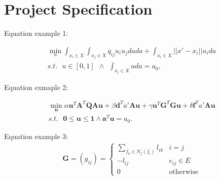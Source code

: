 \chapter{Project Specification}
\label{cha:Project Specification}

Equation example 1:

\begin{equation}
\begin{split}
\min_u \int_{x_i\in X}\int_{x_j\in X} q_{ij} u_i u_j da da + \int_{x_i\in X}||x' - x_i|| u_i da \\
s.t. \ \ \ u\in[0,1] \ \ \land  \ \ \int_{x_i\in X}u da = a_0,
\end{split}
\end{equation}

Equation exmaple 2:

\begin{equation}
\begin{split}
\min_{\mathbf{u}} \alpha \mathbf{u}^T \mathbf{A}^T \mathbf{Q} \mathbf{A} \mathbf{u} +  \beta \mathbf{d}^T a' \mathbf{A} \mathbf{u} + \gamma \mathbf{u}^T \mathbf{G}^T \mathbf{G} \mathbf{u} + \delta\mathbf{f}^T a' \mathbf{A} \mathbf{u} \\
s.t. \ \ \ \mathbf{0} \leq \mathbf{u} \leq \mathbf{1} \land \mathbf{a}^T\mathbf{u}=a_0.
\end{split}
\end{equation}

Equation example 3:
\begin{align}
\mathbf{G}=(g_{ij}) = \left\lbrace
\begin{array}{ll}
\sum_{f_k\in N_f(f_i)} l_{ik} & i=j\\
-l_{ij} & e_{ij}\in E\\
0 & \text{otherwise}
\end{array}
\right.
\end{align}




